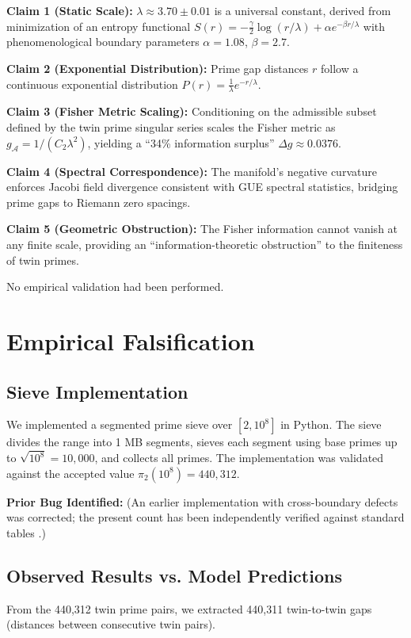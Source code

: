 \documentclass[11pt]{article}
\begin{document}
\noindent \textbf{Claim 1 (Static Scale):} $\lambda \approx 3.70 \pm 0.01$ is a universal constant, derived from minimization of an entropy functional $S(r) = -\frac{\gamma}{2} \log(r/\lambda) + \alpha e^{-\beta r/\lambda}$ with phenomenological boundary parameters $\alpha = 1.08$, $\beta = 2.7$.

\noindent \textbf{Claim 2 (Exponential Distribution):} Prime gap distances $r$ follow a continuous exponential distribution $P(r) = \frac{1}{\lambda} e^{-r/\lambda}$.

\noindent \textbf{Claim 3 (Fisher Metric Scaling):} Conditioning on the admissible subset defined by the twin prime singular series scales the Fisher metric as $g_{\mathcal{A}} = 1/(C_2 \lambda^2)$, yielding a ``34\% information surplus'' $\Delta g \approx 0.0376$.

\noindent \textbf{Claim 4 (Spectral Correspondence):} The manifold's negative curvature enforces Jacobi field divergence consistent with GUE spectral statistics, bridging prime gaps to Riemann zero spacings.

\noindent \textbf{Claim 5 (Geometric Obstruction):} The Fisher information cannot vanish at any finite scale, providing an ``information-theoretic obstruction'' to the finiteness of twin primes.

No empirical validation had been performed.

\section{Empirical Falsification}
\subsection{Sieve Implementation}
We implemented a segmented prime sieve over $[2, 10^8]$ in Python. The sieve divides the range into 1 MB segments, sieves each segment using base primes up to $\sqrt{10^8} = 10{,}000$, and collects all primes. The implementation was validated against the accepted value $\pi_2(10^8) = 440{,}312$.

\noindent \textbf{Prior Bug Identified:} (An earlier implementation with cross-boundary defects was corrected; the present count has been independently verified against standard tables \cite{Nic12}.)

\subsection{Observed Results vs. Model Predictions}
From the 440,312 twin prime pairs, we extracted 440,311 twin-to-twin gaps (distances between consecutive twin pairs).
\end{document}

